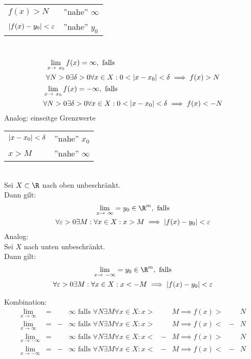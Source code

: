 \begin{def*}[note = uneigentlicher Grenzwert , index = Grenzwert!uneigentlicher]
	\begin{tabular}{ll}
		$f(x) > N$					&''nahe'' $\infty$	\\
		$\abs{f(x) - y_0} < \varepsilon$	&''nahe'' $y_0$	
	\end{tabular}\\
	\begin{gather*}
		\begin{split}
			&\lim_{x \rightarrow x_0} f(x) = \infty, \text{ falls } \\
			&\forall N > 0 \exists \delta > 0 \forall x \in X : 0 < \abs{x-x_0} < \delta \implies f(x) > N
		\end{split} \\
		\begin{split}
			&\lim_{x \rightarrow x_0} f(x) = -\infty, \text{ falls } \\
			&\forall N > 0 \exists \delta > 0 \forall x \in X : 0 < \abs{x-x_0} < \delta \implies f(x) < -N
		\end{split}
	\end{gather*}
	Analog: einseitge Grenzwerte
\end{def*}
\begin{def*}
	\begin{tabular}{ll}
		$\abs{x-x_0} < \delta$	&''nahe'' $x_0$	\\
		$x > M$				&''nahe'' $\infty$	
	\end{tabular}\\
	Sei $X \subset \R$ nach oben unbeschränkt. \\
	Dann gilt:
	\begin{gather*}
		\lim_{x \rightarrow \infty} = y_0 \in \R^m , \text{ falls} \\
		\forall \epsilon > 0 \exists M : \forall x \in X : x > M \implies \abs{f(x) - y_0} < \epsilon
	\end{gather*}
	Analog: \\
	Sei $X$ nach unten unbeschränkt. \\
	Dann gilt:
	\begin{gather*}
		\lim_{x \rightarrow -\infty} = y_0 \in \R^m , \text{ falls} \\
		\forall \epsilon > 0 \exists M : \forall x \in X : x < -M \implies \abs{f(x) - y_0} < \epsilon
	\end{gather*}
	
	Kombination:\\
	\begin{align*}
		\lim_{x \rightarrow \infty}	&=	&	&\infty \text{ falls } \forall N \exists M \forall x \in X : x >	&	&M \implies f(x) >	&	&N \\
		\lim_{x \rightarrow \infty}	&=	&- 	&\infty \text{ falls } \forall N \exists M \forall x \in X : x >	&	&M \implies f(x) <	&-	&N \\
		\lim_{x \rightarrow -\infty}	&=	&	&\infty \text{ falls } \forall N \exists M \forall x \in X : x <	&-	&M \implies f(x) >	&	&N \\
		\lim_{x \rightarrow -\infty}	&=	&-	&\infty \text{ falls } \forall N \exists M \forall x \in X : x <	&-	&M \implies f(x) <	&-	&N 
	\end{align*}
\end{def*}
